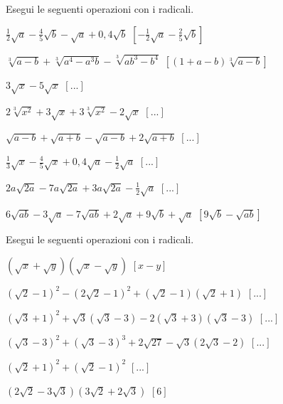 \begin{esercizio}[\Ast]
 \label{ese:2.52}
Esegui le seguenti operazioni con i radicali.
 \begin{enumeratea}
 \item \(\frac 1 2\sqrt a-\frac 4 5\sqrt b-\sqrt a+0,4\sqrt b\)
  \hfill \(\left[-\frac 1 2\sqrt a-\frac 2 5\sqrt b\right]\)
 \item \(\sqrt[3]{a-b}+\sqrt[3]{a^4-a^3b}-\sqrt[3]{{ab}^3-b^4}\)
  \hfill \(\left[(1+a-b)\sqrt[3]{a-b}\right]\)
 \item \(3\sqrt x-5\sqrt x\)
  \hfill \(\left[...\right]\)
 \item \(2\sqrt[3]{x^2}+3\sqrt x+3\sqrt[3]{x^2}-2\sqrt x\)
  \hfill \(\left[...\right]\)
 \item \(\sqrt{a-b}+\sqrt{a+b}-\sqrt{a-b}+2\sqrt{a+b}\)
  \hfill \(\left[...\right]\)
 \item \(\frac 1 3\sqrt x-\frac 4 5\sqrt x+0,4\sqrt a-\frac 1 2\sqrt a\)
  \hfill \(\left[...\right]\)
 \item \(2a\sqrt{2a}-7a\sqrt{2a}+3a\sqrt{2a}-\frac 1 2\sqrt a\)
  \hfill \(\left[...\right]\)
 \item \(6\sqrt{{ab}}-3\sqrt a-7\sqrt{{ab}}+2\sqrt a+9\sqrt b+\sqrt a\)
  \hfill \(\left[9\sqrt b-\sqrt{ab}\right]\)
 \end{enumeratea}
\end{esercizio}

\begin{esercizio}[\Ast]
 \label{ese:2.59}
Esegui le seguenti operazioni con i radicali.
 \begin{enumeratea}
 \item \((\sqrt x+\sqrt y)(\sqrt x-\sqrt y)\)
  \hfill \(\left[x-y\right]\)
 \item \((\sqrt 2-1)^2-(2\sqrt 2-1)^2+(\sqrt 2-1)(\sqrt 2+1)\)
  \hfill \(\left[...\right]\)
 \item \((\sqrt 3+1)^2+\sqrt 3(\sqrt 3-3)-2(\sqrt 3+3)(\sqrt 3-3)\)
  \hfill \(\left[...\right]\)
 \item \((\sqrt 3-3)^2+(\sqrt 3-3)^3+2\sqrt{27}-\sqrt 3(2\sqrt 3-2)\)
  \hfill \(\left[...\right]\)
 \item \((\sqrt 2+1)^2+(\sqrt 2-1)^2\)
  \hfill \(\left[...\right]\)
 \item \((2\sqrt 2-3\sqrt 3)(3\sqrt 2+2\sqrt 3)\)
  \hfill \(\left[6\right]\)
 \end{enumeratea}
\end{esercizio}

